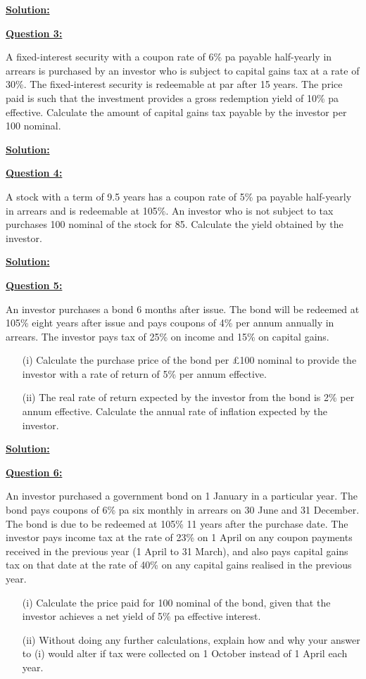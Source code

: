 \documentclass[11pt, answers]{exam}
\begin{document}
\underline{\textbf{Solution:}}\bigskip


\bigskip\bigskip
\underline{\textbf{Question 3:}}\bigskip

A fixed-interest security with a coupon rate of 6\% pa payable half-yearly in arrears is purchased by an investor who is subject to capital gains tax at a rate of 30\%. The fixed-interest security is redeemable at par after 15 years. The price paid is such that the investment provides a gross redemption yield of 10\% pa effective. Calculate the amount of capital gains tax payable by the investor per 100 nominal.

\bigskip\bigskip
\underline{\textbf{Solution:}}\bigskip


\bigskip\bigskip

\underline{\textbf{Question 4:}}\bigskip

A stock with a term of 9.5 years has a coupon rate of 5\% pa payable half-yearly in arrears and is redeemable at 105\%. An investor who is not subject to tax purchases 100 nominal of the stock for 85. Calculate the yield obtained by the investor.

\bigskip\bigskip

\underline{\textbf{Solution:}}\bigskip

\underline{\textbf{Question 5:}}\bigskip

An investor purchases a bond 6 months after issue. The bond will be redeemed at 105\% eight
years after issue and pays coupons of 4\% per annum annually in arrears. The investor pays tax of 25\% on income and 15\% on capital gains.
\begin{itemize}
\item[(i)] Calculate the purchase price of the bond per £100 nominal to provide the investor with a rate of return of 5\% per annum effective. 
\item[(ii)] The real rate of return expected by the investor from the bond is 2\% per annum effective. Calculate the annual rate of inflation expected by the investor.
\end{itemize}
\bigskip\bigskip

\underline{\textbf{Solution:}}\bigskip


\underline{\textbf{Question 6:}}\bigskip

An investor purchased a government bond on 1 January in a particular year. The bond pays
coupons of 6\% pa six monthly in arrears on 30 June and 31 December. The bond is due to be redeemed at 105\% 11 years after the purchase date.
The investor pays income tax at the rate of 23\% on 1 April on any coupon payments received in the previous year (1 April to 31 March), and also pays capital gains tax on that date at the rate of 40\% on any capital gains realised in the previous year.
\begin{itemize}
\item[(i)] Calculate the price paid for 100 nominal of the bond, given that the investor achieves a net yield of 5\% pa effective interest. 
\item[(ii)] Without doing any further calculations, explain how and why your answer to (i) would alter if tax were collected on 1 October instead of 1 April each year.
\end{itemize}
\bigskip\bigskip
\end{document}
